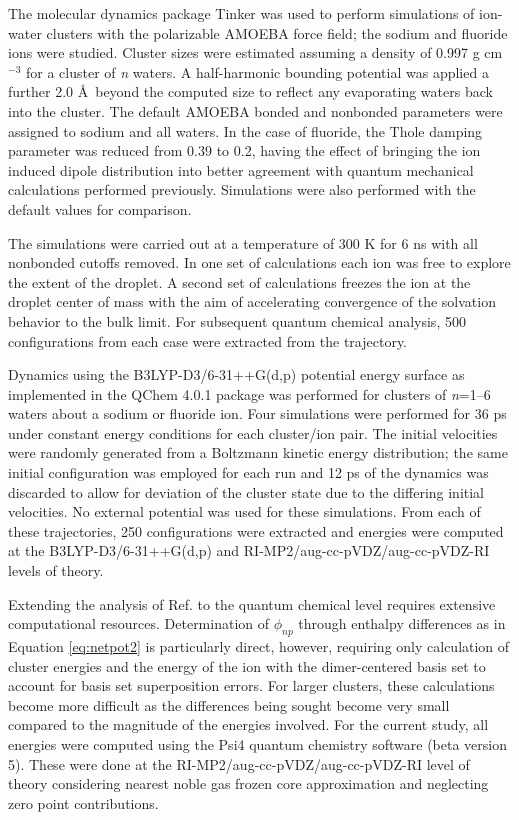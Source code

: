 \begin{cpa}
  The molecular dynamics package Tinker\cite{ponder2004tinker} was used to perform simulations of ion-water clusters with the polarizable AMOEBA force field\cite{amoeba};
  the sodium and fluoride ions were studied. Cluster sizes were estimated assuming a density of 0.997 g cm$^{-3}$ for a cluster of \emph{n} waters. A half-harmonic 
  bounding potential was applied a further 2.0 \AA~beyond the computed size to reflect any evaporating waters back into the cluster. The default AMOEBA bonded and 
  nonbonded parameters were assigned to sodium and all waters. In the case of fluoride, the Thole damping parameter was reduced from 0.39 to 0.2, having the effect 
  of bringing the ion induced dipole distribution into better agreement with quantum mechanical calculations performed 
  previously\cite{masia2009polarize,rogers2010ctpolar,baer2011toward}. Simulations were also performed with the default values for comparison. 
  
  The simulations were carried out at a temperature of 300 K for 6 ns with all nonbonded cutoffs removed. In one set of calculations each ion was free to explore the
  extent of the droplet. A second set of calculations freezes the ion at the droplet center of mass with the aim of accelerating convergence of the solvation behavior
  to the bulk limit. For subsequent quantum chemical analysis, 500 configurations from each case were extracted from the trajectory.
  
  Dynamics using the B3LYP-D3/6-31++G(d,p)\cite{grimme2010d2} potential energy surface as implemented in the QChem 4.0.1 package\cite{shao2006qchem,krylov2013qchem} was
  performed for clusters of \emph{n}=1--6 waters about a sodium or fluoride ion. Four simulations were performed for 36 ps under constant energy conditions for each
  cluster/ion pair. The initial velocities were randomly generated from a Boltzmann kinetic energy distribution; the same initial configuration was employed for each
  run and 12 ps of the dynamics was discarded to allow for deviation of the cluster state due to the differing initial velocities. No external potential was used for
  these simulations. From each of these trajectories, 250 configurations were extracted and energies were computed at the B3LYP-D3/6-31++G(d,p) and
  RI-MP2/aug-cc-pVDZ/aug-cc-pVDZ-RI levels of theory.
  
  Extending the analysis of Ref. \cite{pollard2014cpa1} to the quantum chemical level requires extensive computational resources. Determination of $\phi_{np}$ through 
  enthalpy differences as in Equation \ref{eq:netpot2} is particularly direct, however, requiring only calculation of cluster energies and the energy of the ion with
  the dimer-centered basis set to account for basis set superposition errors. For larger clusters, these calculations become more difficult as the differences being
  sought become very small compared to the magnitude of the energies involved. For the current study, all energies were computed using the Psi4 quantum chemistry 
  software (beta version 5)\cite{sherrill2012psi4}. These were done at the RI-MP2/aug-cc-pVDZ/aug-cc-pVDZ-RI level of theory considering nearest noble gas frozen core
  approximation and neglecting zero point contributions.
  

\end{cpa}
